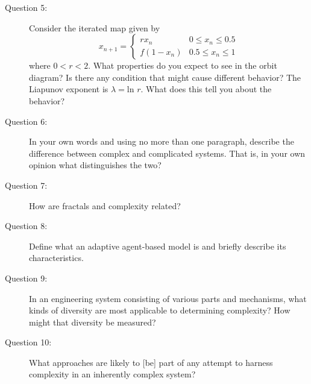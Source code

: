 \documentclass[letterpaper,10pt]{article}
\begin{document}
\begin{description}
\item[Question 5:]
Consider the iterated map given by
\[x_{n+1} = \left\{
  \begin{array}{lr}
    rx_n &  0\le x_n \le 0.5 \\
    f(1-x_n) &  0.5\le x_n \le 1
  \end{array}
\right.
\]
where $0<r<2$.  What properties do you expect to see in the orbit diagram?  Is there any condition that might cause different behavior?  The Liapunov exponent is $\lambda=\mbox{ln\ }r$.  What does this tell you about the behavior?

\item[Question 6:]In your own words and using no more than one paragraph, describe the difference between complex and complicated systems.  That is, in your own opinion what distinguishes the two?

\item[Question 7:]
How are fractals and complexity related?

\item[Question 8:]
Define what an adaptive agent-based model is and briefly describe its characteristics.

\item[Question 9:]
In an engineering system consisting of various parts and mechanisms, what kinds of diversity are most applicable to determining complexity?  How might that diversity be measured?

\item[Question 10:]
What approaches are likely to [be] part of any attempt to harness complexity in an inherently complex system?

\end{description}
\end{document}
